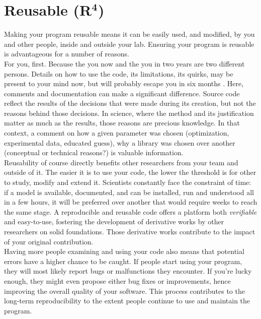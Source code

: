 \documentclass[a4paper,11pt]{article}
\begin{document}
\section*{Reusable (R$^{\mathbf 4}$)}

Making your program reusable means it can be easily used, and modified, by you and other people, inside and outside your lab. Ensuring your program is reusable is advantageous for a number of reasons.\\

For you, first. Because the you now and the you in two years are two different persons. Details on how to use the code, its limitations, its quirks, may be present to your mind now, but will probably escape you in six months \parencite{Donoho:2009}. Here, comments and documentation can make a significant difference. Source code reflect the results of the decisions that were made during its creation, but not the reasons behind those decisions. In science, where the method and its justification matter as much as the results, those reasons are precious knowledge. In that context, a comment on how a given parameter was chosen (optimization, experimental data, educated guess), why a library was chosen over another (conceptual or technical reasons?) is valuable information.\\


Reusability of course directly benefits other researchers from your team and outside of it. The easier it is to use your code, the lower the threshold is for other to study, modify and extend it. Scientists constantly face the constraint of time: if a model is available, documented, and can be installed, run and understood all in a few hours, it will be preferred over another that would require weeks to reach the same stage. A reproducible and reusable code offers a platform both \emph{verifiable} and easy-to-use, fostering the development of derivative works by other researchers on solid foundations. Those derivative works contribute to the impact of your original contribution.\\

Having more people examining and using your code also means that potential errors have a higher chance to be caught. If people start using your program, they will most likely report bugs or malfunctions they encounter. If you're lucky enough, they might even propose either bug fixes or improvements, hence improving the overall quality of your software. This process contributes to the long-term reproducibility to the extent people continue to use and maintain the program.\\
\end{document}

